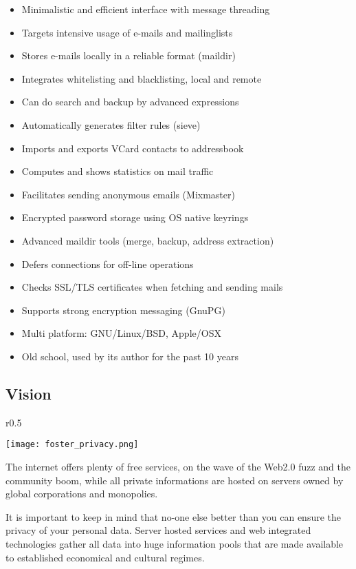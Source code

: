 \documentclass[a4,onecolumn,portrait]{article}
\begin{document}
\footnotesize
\begin{itemize}
\item Minimalistic and efficient interface with message threading
\item Targets intensive usage of e-mails and mailinglists
\item Stores e-mails locally in a reliable format (maildir)
\item Integrates whitelisting and blacklisting, local and remote
\item Can do search and backup by advanced expressions
\item Automatically generates filter rules (sieve)
\item Imports and exports VCard contacts to addressbook
\item Computes and shows statistics on mail traffic
\item Facilitates sending anonymous emails (Mixmaster)
\item Encrypted password storage using OS native keyrings
\item Advanced maildir tools (merge, backup, address extraction)
\item Defers connections for off-line operations
\item Checks SSL/TLS certificates when fetching and sending mails
\item Supports strong encryption messaging (GnuPG)
\item Multi platform: GNU/Linux/BSD, Apple/OSX
\item Old school, used by its author for the past 10 years
\end{itemize}
\normalsize
\subsection{Vision}
\label{sec-1-2}

\begin{wrapfigure}{r}{0.5\textwidth}
  \begin{center}
    \texttt{[image: foster\_privacy.png]}
  \end{center}
\end{wrapfigure}
The internet offers plenty of free services, on the wave of the Web2.0
fuzz and the community boom, while all private informations are hosted
on servers owned by global corporations and monopolies.

It is important to keep in mind that no-one else better than you can
ensure the privacy of your personal data. Server hosted services and
web integrated technologies gather all data into huge information
pools that are made available to established economical and cultural
regimes.
\end{document}
